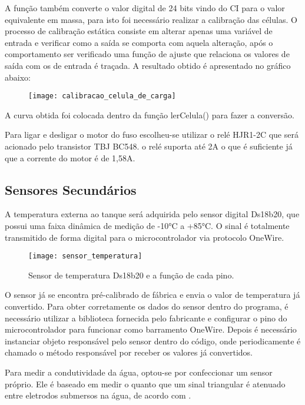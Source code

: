 A função também converte o valor digital de 24 bits vindo do CI para o valor equivalente em massa, para isto foi necessário realizar a calibração das células. O processo de calibração estática consiste em alterar apenas uma variável de entrada e verificar como a saída se comporta com aquela alteração, após o comportamento ser verificado uma função de ajuste que relaciona os valores de saída com os de entrada é traçada. A resultado obtido é apresentado no gráfico abaixo:

\begin{figure}[!h]
\centering \texttt{[image: calibracao\_celula\_de\_carga]}
\label{calibracaocelula}
 \end{figure}

\pagebreak

A curva obtida foi colocada dentro da função lerCelula() para fazer a conversão.

Para ligar e desligar o motor do fuso escolheu-se utilizar o relé HJR1-2C que será acionado pelo transistor TBJ BC548. o relé suporta até 2A o que é suficiente já que a corrente do motor é de 1,58A.

\subsection{Sensores Secundários}

A temperatura externa ao tanque será adquirida pelo sensor digital Ds18b20, que possui uma faixa dinâmica de medição de -10°C a +85°C. O sinal é totalmente transmitido de forma digital para o microcontrolador via protocolo OneWire.

\begin{figure}[!h]
\centering \texttt{[image: sensor\_temperatura]}
\caption{Sensor de temperatura Ds18b20 e a função de cada pino.}
\label{sensortemp}
\end{figure}


\pagebreak

O sensor já se encontra pré-calibrado de fábrica e envia o valor de temperatura já convertido.
Para obter corretamente os dados do sensor dentro do programa, é necessário utilizar a biblioteca fornecida pelo fabricante e configurar o pino do microcontrolador para funcionar como barramento OneWire. Depois é necessário instanciar objeto responsável pelo sensor dentro do código, onde periodicamente é chamado o método responsável por receber os valores já convertidos. \cite{avia:temp}

Para medir a condutividade da água, optou-se por confeccionar um sensor próprio. Ele é baseado em medir o quanto que um sinal triangular é atenuado entre eletrodos submersos na água, de acordo com \cite{avia:condut}.

